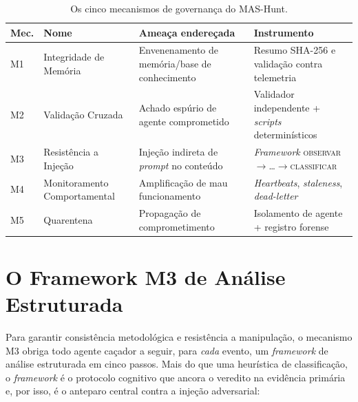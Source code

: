\begin{table}[htbp]
  \centering
  \caption{Os cinco mecanismos de governança do MAS-Hunt.}
  \label{tab:m-mecanismos}
  \footnotesize
  \begin{tabular}{@{}p{1.2cm}p{3.0cm}p{4.2cm}p{4.0cm}@{}}
    \toprule
    \textbf{Mec.} & \textbf{Nome} & \textbf{Ameaça endereçada} & \textbf{Instrumento} \\
    \midrule
    M1 & Integridade de Memória & Envenenamento de memória/base de conhecimento & Resumo SHA-256 e validação contra telemetria \\
    M2 & Validação Cruzada & Achado espúrio de agente comprometido & Validador independente + \emph{scripts} determinísticos \\
    M3 & Resistência a Injeção & Injeção indireta de \emph{prompt} no conteúdo & \emph{Framework} \textsc{observar}$\rightarrow$\ldots$\rightarrow$\textsc{classificar} \\
    M4 & Monitoramento Comportamental & Amplificação de mau funcionamento & \emph{Heartbeats}, \emph{staleness}, \emph{dead-letter} \\
    M5 & Quarentena & Propagação de comprometimento & Isolamento de agente + registro forense \\
    \bottomrule
  \end{tabular}
\end{table}

\section{O Framework M3 de Análise Estruturada}
\label{sec:arq-framework-m3}

Para garantir consistência metodológica e resistência a manipulação, o mecanismo
M3 obriga todo agente caçador a seguir, para \emph{cada} evento, um
\emph{framework} de análise estruturada em cinco passos. Mais do que uma
heurística de classificação, o \emph{framework} é o protocolo cognitivo que ancora
o veredito na evidência primária e, por isso, é o anteparo central contra a
injeção adversarial:

